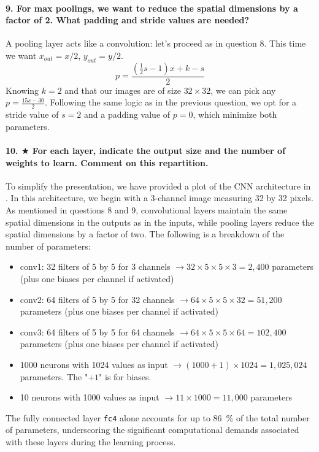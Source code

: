 \paragraph{9. For max poolings, we want to reduce the spatial dimensions by a factor of 2. What padding and stride values are needed?}
A pooling layer acts like a convolution: let's proceed as in question 8. This time we want $ x_{out} = x/2$, $ y_{out} = y/2 $.
\[
    p = \frac{(\frac{1}{2}s - 1) x + k - s}{2}
\]
Knowing $k = 2$ and that our images are of size $32 \times 32 $, we can pick any $p = \frac{15s - 30}{2}$. Following the same logic as in the previous question, we opt for a stride value of $ s = 2 $ and a padding value of $ p = 0 $, which minimize both parameters.

\paragraph{10. $ \bigstar $ For each layer, indicate the output size and the number of weights to learn. Comment on this repartition.}
To simplify the presentation, we have provided a plot of the CNN architecture in . In this architecture, we begin with a 3-channel image measuring 32 by 32 pixels. As mentioned in questions 8 and 9, convolutional layers maintain the same spatial dimensions in the outputs as in the inputs, while pooling layers reduce the spatial dimensions by a factor of two. The following is a breakdown of the number of parameters:
\begin{itemize}
    \item conv1: 32 filters of 5 by 5 for 3 channels $\rightarrow 32\times 5\times 5\times 3 = 2,400$ parameters (plus one biases per channel if activated)
    \item conv2: 64 filters of 5 by 5 for 32 channels $\rightarrow 64\times 5\times 5\times 32 = 51,200$ parameters (plus one biases per channel if activated)
    \item conv3: 64 filters of 5 by 5 for 64 channels $\rightarrow 64\times 5\times 5\times 64 = 102,400$ parameters (plus one biases per channel if activated)
    \item 1000 neurons with 1024 values as input $\rightarrow (1000 + 1)\times 1024=1,025,024$ parameters. The "$+1$" is for biases.
    \item 10 neurons with 1000 values as input $\rightarrow 11\times 1000=11,000$ parameters
\end{itemize}

The fully connected layer \texttt{fc4} alone accounts for up to 86~\% of the total number of parameters, underscoring the significant computational demands associated with these layers during the learning process.

